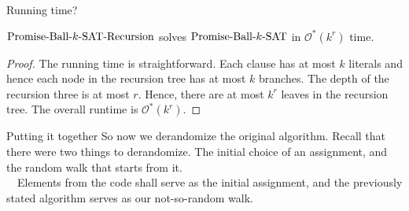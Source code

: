 \documentclass[pdf] {beamer}
\newcommand{\SAT}{\textnormal{$k$-SAT}}
\newcommand{\PBS}{\textnormal{Promise-Ball-$\SAT$}}
\renewcommand{\O}{\mathcal{O}^*}
\begin{document}
	\begin{frame}{Running time?}
		\begin{lemma}
			$\PBS \textnormal{-Recursion}$ solves $\PBS$ in $\O(k^r)$ time.
		\end{lemma}
		\begin{proof}
			The running time is straightforward. Each clause has at most $k$ literals and hence each node in the recursion tree has at most $k$ branches. The depth of the recursion three is at most $r$. Hence, there are at most $k^r$ leaves in the recursion tree. The overall runtime is $\O(k^r)$. \par 
		\end{proof}
	\end{frame}
	\begin{frame}{Putting it together}
		So now we derandomize the original algorithm. Recall that there were two things to derandomize. The initial choice of an assignment, and the random walk that starts from it. \\~\
		Elements from the code shall serve as the initial assignment, and the previously stated algorithm serves as our not-so-random walk.
	\end{frame}
\end{document}
